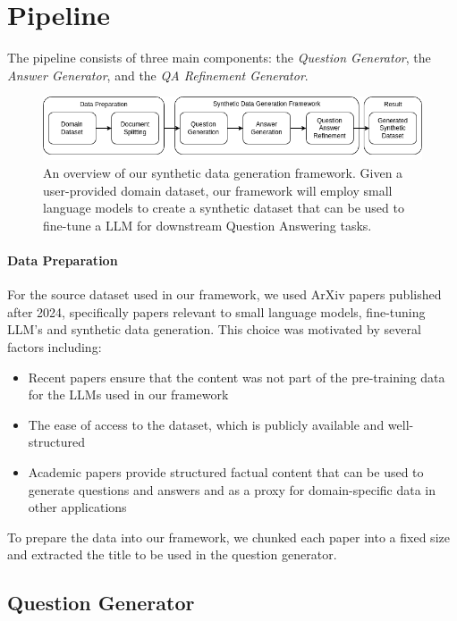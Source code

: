 \section{Pipeline}\label{sec:pipeline}

The pipeline consists of three main components: the \textit{Question Generator}, the \textit{Answer Generator}, and the \textit{QA Refinement Generator}.

\begin{figure}[h]
  \centering
  \includegraphics[width=\textwidth]{methodology-overview.png}
  \caption{An overview of our synthetic data generation framework. Given a user-provided domain dataset, our
framework will employ small language models to create a synthetic dataset that can be used
to fine-tune a LLM for downstream Question Answering tasks.}
\end{figure}

\paragraph{Data Preparation}
For the source dataset used in our framework, we used ArXiv papers published after 2024, specifically papers relevant to
small language models, fine-tuning LLM's and synthetic data generation.
This choice was motivated by several factors including:
\begin{itemize}
  \item Recent papers ensure that the content was not part of the pre-training data for the LLMs used in our framework
  \item The ease of access to the dataset, which is publicly available and well-structured
  \item Academic papers provide structured factual content that can be used to generate questions and answers and as a proxy for
  domain-specific data in other applications
\end{itemize}

To prepare the data into our framework, we chunked each paper into a fixed size and extracted the title to be used in the
question generator.

\subsection{Question Generator}\label{sec:question-generator}

